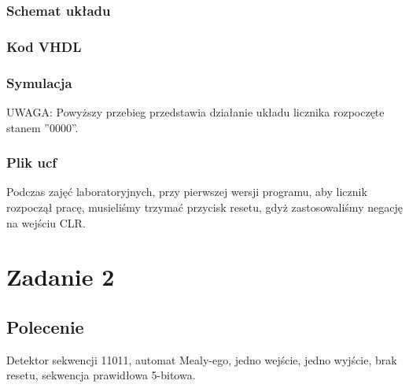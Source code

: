 \documentclass[a4paper,12pt]{extarticle}  %
\begin{document}
\subsubsection{Schemat układu}
\begin{figure}[H]
	\centering
\end{figure}
\subsubsection{Kod VHDL}

\subsubsection{Symulacja}
\begin{figure}[H]
	\centering
\end{figure}
UWAGA: Powyższy przebieg przedstawia działanie układu licznika rozpoczęte stanem ''0000''. 
\subsubsection{Plik ucf}


Podczas zajęć laboratoryjnych, przy pierwszej wersji programu, aby licznik rozpoczął pracę, musieliśmy trzymać przycisk resetu, gdyż zastosowaliśmy negację na wejściu CLR.
\newpage
\section{Zadanie 2}
\subsection{Polecenie}
Detektor sekwencji 11011, automat Mealy-ego, jedno wejście, jedno wyjście, brak resetu, sekwencja prawidłowa 5-bitowa.
\end{document}
